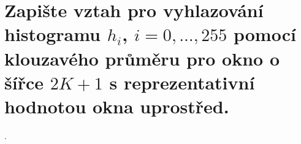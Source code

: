 \section{Zapište vztah pro vyhlazování histogramu \texorpdfstring{$h_i$}{hi}, 
\texorpdfstring{$i=0,\dots,255$}{i=0,\dots,255} pomocí klouzavého průměru pro okno o šířce \texorpdfstring{$2K+1$}{2K+1} 
s reprezentativní hodnotou okna uprostřed.}.